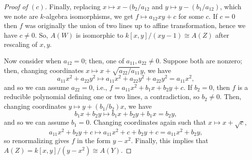 \documentclass[12pt,letterpaper]{article}
\theoremstyle{definition}
\theoremstyle{remark}
\numberwithin{equation}{section}
\numberwithin{figure}{problem}
\begin{document}
\begin{proof}[Proof of $(c)$]
  Finally, replacing $x \mapsto x - (b_2/a_{12}$ and
  $y \mapsto y - (b_1/a_{12})$, which we note are $k$-algebra isomorphisms,
  we get $f \mapsto a_{12}xy + c$ for some $c$.
  If $c = 0$ then $f$ was originally the union of two lines up to affine
  transformation, hence we have $c \ne 0$.
  So, $A(W)$ is isomorphic to $k[x,y]/(xy - 1) \cong A(Z)$ after rescaling
  of $x,y$.
  \par Now consider when $a_{12} = 0$; then, one of $a_{11},a_{22} \ne 0$.
  Suppose both are nonzero; then, changing coordinates
  $x \mapsto x + \sqrt{a_{22}/a_{11}}y$, we have
  \begin{equation*}
    a_{11}x^2 + a_{22}y^2 \mapsto a_{11}x^2 + a_{22}y^2 + a_{22}y^2 = a_{11}x^2,
  \end{equation*}
  and so we can assume $a_{22} = 0$, i.e., $f = a_{11}x^2 + b_1x + b_2y + c$.
  If $b_2 = 0$, then $f$ is a reducible polynomial defining one or two lines,
  a contradiction, so $b_2 \ne 0$.
  Then, changing coordinates $y \mapsto y + (b_1/b_2)x$, we have
  \begin{equation*}
    b_1x + b_2y \mapsto b_1x + b_2y + b_1x = b_2y,
  \end{equation*}
  and so we can assume $b_1 = 0$.
  Changing coordinates again such that $x \mapsto x + \sqrt{c}$,
  \begin{equation*}
    a_{11}x^2 + b_2y + c \mapsto a_{11}x^2 + c + b_2y + c = a_{11}x^2 + b_2y,
  \end{equation*}
  so renormalizing gives $f$ in the form $y - x^2$.
  Finally, this implies that $A(Z) = k[x,y]/(y-x^2) \cong A(Y)$.
\end{proof}
\end{document}
